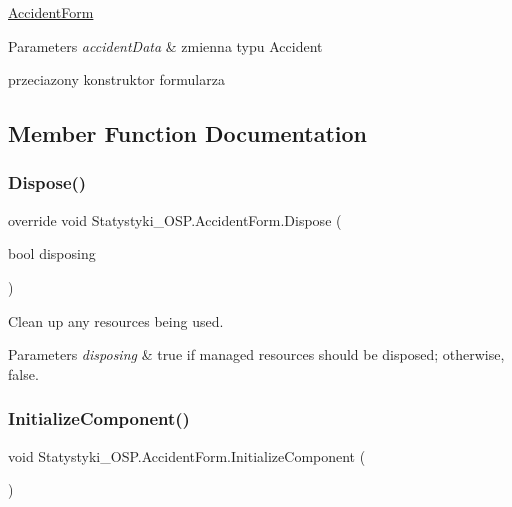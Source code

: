 \mbox{\hyperlink{class_statystyki___o_s_p_1_1_accident_form}{Accident\+Form}} 


\begin{DoxyParams}{Parameters}
{\em accident\+Data} & zmienna typu Accident\\
\hline
\end{DoxyParams}


przeciazony konstruktor formularza

\subsection{Member Function Documentation}
\mbox{\label{class_statystyki___o_s_p_1_1_accident_form_a36cf7a790ab5bad9c14734476e9fd8ed}} 
\subsubsection{\texorpdfstring{Dispose()}{Dispose()}}
{\footnotesize\ttfamily override void Statystyki\+\_\+\+O\+S\+P.\+Accident\+Form.\+Dispose (\begin{DoxyParamCaption}\item[{bool}]{disposing }\end{DoxyParamCaption})\hspace{0.3cm}{\ttfamily [protected]}}



Clean up any resources being used. 


\begin{DoxyParams}{Parameters}
{\em disposing} & true if managed resources should be disposed; otherwise, false.\\
\hline
\end{DoxyParams}
\mbox{\label{class_statystyki___o_s_p_1_1_accident_form_a48cf3cd4afd1e861644da9a2a311834c}} 
\subsubsection{\texorpdfstring{InitializeComponent()}{InitializeComponent()}}
{\footnotesize\ttfamily void Statystyki\+\_\+\+O\+S\+P.\+Accident\+Form.\+Initialize\+Component (\begin{DoxyParamCaption}{ }\end{DoxyParamCaption})\hspace{0.3cm}{\ttfamily [private]}}



